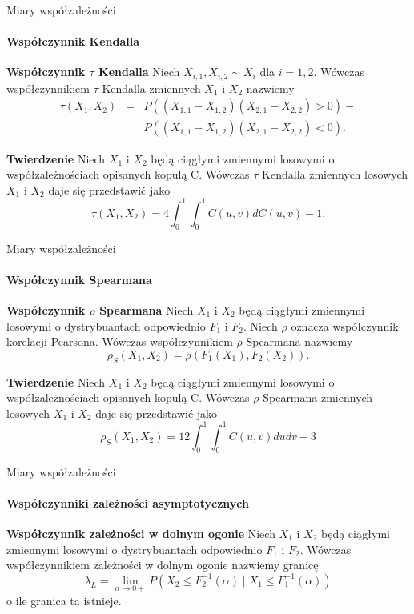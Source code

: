 \documentclass[a4paper, 11pt]{beamer}
\begin{document}
	\begin{frame}{Miary współzależności}
		\framesubtitle{Współczynnik Kendalla}
		\begin{block}{\textbf{Współczynnik $\tau$ Kendalla}}
			Niech $X_{i,1}, X_{i,2} \sim X_{i}$ dla $i=1,2.$ Wówczas współczynnikiem 
			$\tau$ Kendalla zmiennych $X_1$ i $X_2$ nazwiemy \begin{eqnarray*}
					\tau\left(X_{1},X_{2}\right) & = &
						P\left(\left(X_{1,1}-X_{1,2}\right)\left(X_{2,1}-X_{2,2}\right)>0\right) - \\
						& & P\left(\left(X_{1,1}-X_{1,2}\right)\left(X_{2,1}-X_{2,2}\right)<0\right).
				\end{eqnarray*}
		\end{block}
  
		\begin{block}{\textbf{Twierdzenie}}
			Niech $X_{1}$ i $X_{2}$ będą ciągłymi zmiennymi losowymi o współzależnościach opisanych kopulą C.
			Wówczas $\tau$ Kendalla zmiennych losowych $X_{1}$ i $X_{2}$ daje się przedstawić jako \[
				\tau\left(X_{1},X_{2}\right)=4\int_{0}^{1}\int_{0}^{1}C\left(u,v\right)dC\left(u,v\right)-1.
			\]
		\end{block}
	\end{frame}
	
	\begin{frame}{Miary współzależności}
		\framesubtitle{Współczynnik Spearmana}
		\begin{block}{\textbf{Współczynnik $\rho$ Spearmana}}
			Niech $X_1$ i $X_2$ będą ciągłymi zmiennymi losowymi o dystrybuantach odpowiednio
			$F_1$ i $F_2.$ Niech $\rho$ oznacza współczynnik korelacji Pearsona. Wówczas współczynnikiem
			$\rho$ Spearmana nazwiemy \[
				\rho_{S}\left(X_{1},X_{2}\right)=\rho\left(F_{1}\left(X_{1}\right),F_{2}\left(X_{2}\right)\right).
			\]
		\end{block}
	
		\begin{block}{\textbf{Twierdzenie}}
			Niech $X_{1}$ i $X_{2}$ będą ciągłymi zmiennymi losowymi o współzależnościach opisanych kopulą C.
			Wówczas $\rho$ Spearmana zmiennych losowych $X_{1}$ i $X_{2}$ daje się przedstawić jako \[
				\rho_{S}\left(X_{1},X_{2}\right)=12\int_{0}^{1}\int_{0}^{1}C\left(u,v\right)dudv-3
			\]
		\end{block}
	\end{frame}
	
	\begin{frame}{Miary współzależności}
		\framesubtitle{Współczynniki zależności asymptotycznych}
		\begin{block}{\textbf{Współczynnik zależności w dolnym ogonie}}
			Niech $X_{1}$ i $X_{2}$ będą ciągłymi zmiennymi losowymi o dystrybuantach
			odpowiednio $F_{1}$ i $F_{2}.$ Wówczas współczynnikiem zależności w
			dolnym ogonie nazwiemy granicę \[
				\lambda_{L} = 
					\lim_{\alpha\rightarrow0+} P\left(
						X_{2}\leq F_{2}^{-1}\left(\alpha\right)\mid X_{1}\leq F_{1}^{-1}\left(\alpha\right)
					\right)
			\] o ile granica ta istnieje.
		\end{block}
	\end{frame}
	
\end{document}
